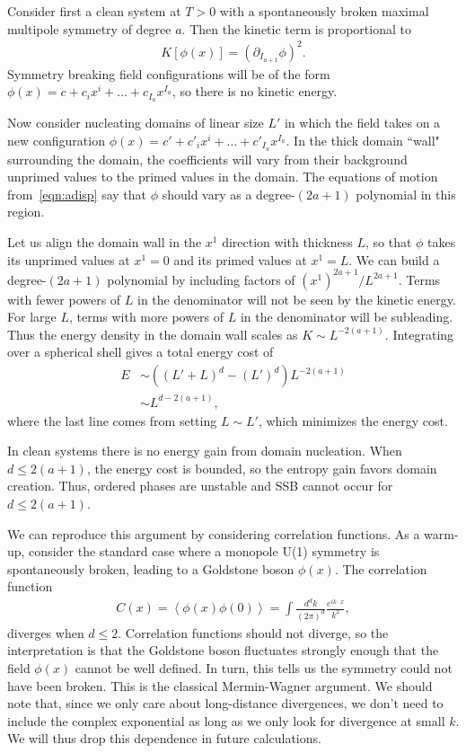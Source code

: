 \documentclass[prb,aps,twocolumn, amsfonts,amsmath,amssymb,nofootinbib,superscriptaddress]{revtex4-2}
\begin{document}
Consider first a clean system at $T>0$ with a spontaneously broken maximal multipole symmetry of degree $a$.
Then the kinetic term is proportional to 
\begin{align}
K[\phi(x)] = (\partial_{I_{a+1}} \phi)^2. \label{eqn:adisp}
\end{align} 
Symmetry breaking field configurations will be of the form $\phi(x) = c + c_ix^i + \dots+ c_{I_a}x^{I_a}$, so there is no kinetic energy. 

Now consider nucleating domains of linear size $L'$ in which the field takes on a new configuration $\phi(x) = c' + c'_ix^i + \dots + c'_{I_a}x^{I_a}$. In the thick domain ``wall" surrounding the domain, the coefficients will vary from their background unprimed values to the primed values in the domain. The equations of motion from~\eqref{eqn:adisp} say that $\phi$ should vary as a degree-$(2a+1)$ polynomial in this region.

Let us align the domain wall in the $x^1$ direction with thickness $L$, so that $\phi$ takes its unprimed values at $x^1=0$ and its primed values at $x^1=L$. We can build a degree-$(2a+1)$ polynomial by including factors of $(x^1)^{2a+1}/L^{2a+1}$. Terms with fewer powers of $L$ in the denominator will not be seen by the kinetic energy. For large $L$, terms with more powers of $L$ in the denominator will be subleading. Thus the energy density in the domain wall scales as $K\sim L^{-2(a+1)}$. Integrating over a spherical shell gives a total energy cost of
\begin{align}
E &\sim \left( (L'+L)^d -(L')^d \right) L^{-2(a+1)} \nonumber\\
&\sim L^{d-2(a+1)},
\end{align}
where the last line comes from setting $L\sim L'$, which minimizes the energy cost.

In clean systems there is no energy gain from domain nucleation. When $d\le2(a+1)$, the energy cost is bounded, so the entropy gain favors domain creation. Thus, ordered phases are unstable and SSB cannot occur for $d\le2(a+1)$.

We can reproduce this argument by considering correlation functions. As a warm-up, consider the standard case where a monopole U(1) symmetry is spontaneously broken, leading to a Goldstone boson $\phi(x)$. The correlation function
\begin{align}
C(x) = \left\langle \phi(x) \phi(0) \right\rangle = \int \frac{d^dk}{(2\pi)^d} \frac{e^{i k \cdot x}}{k^2}, 
\end{align}
diverges when $d\le 2$. Correlation functions should not diverge, so the interpretation is that the Goldstone boson fluctuates strongly enough that the field $\phi(x)$ cannot be well defined. In turn, this tells us the symmetry could not have been broken. This is the classical Mermin-Wagner argument. We should note that, since we only care about long-distance divergences, we don't need to include the complex exponential as long as we only look for divergence at small $k$. We will thus drop this dependence in future calculations. 
\end{document}
